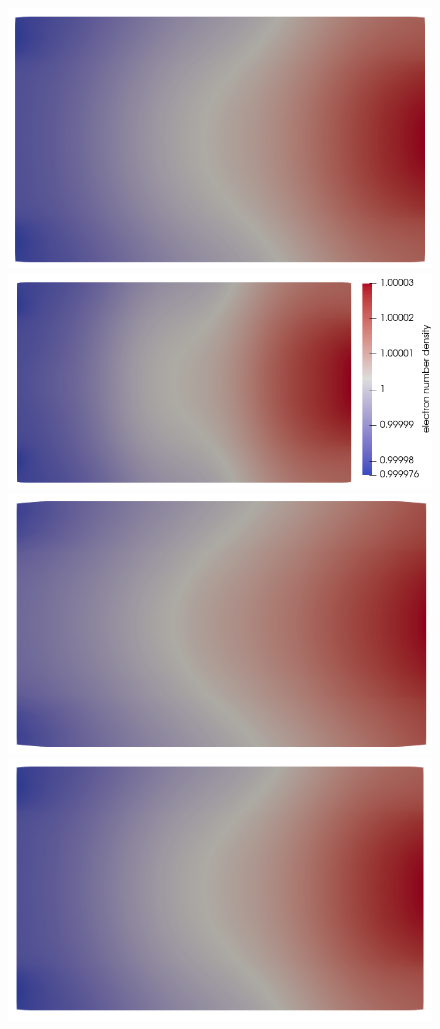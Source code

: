 \documentclass{report}
\begin{document}
\begin{figure}
    \includegraphics[scale=0.27]{slice_ne_T-1_lambda-0_16-3-3.png}
    \includegraphics[scale=0.27]{slice_ne_T-1_lambda-0_32-3-4.png}
    \includegraphics[scale=0.27]{slice_ni_T-1_lambda-0_8-2-2.png}
    \includegraphics[scale=0.27]{slice_ni_T-1_lambda-0_16-3-3.png}

\end{figure}
\end{document}
